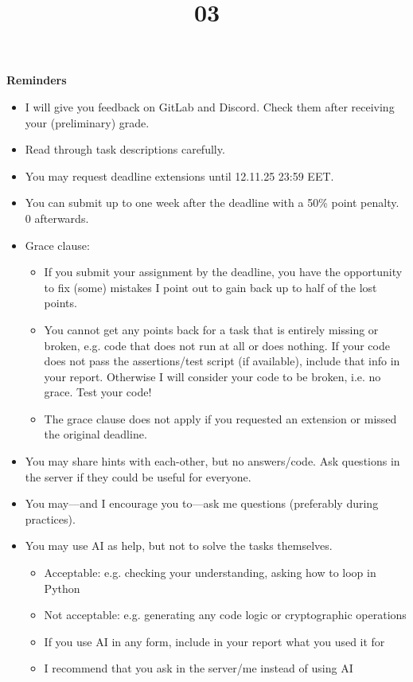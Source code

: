\documentclass{homework}
\title{03}
\date{\DTMdate{2025-11-15}}
\begin{document}
\maketitle

\textbf{Reminders}

\begin{itemize}
  \item I will give you feedback on GitLab and Discord.
  Check them after receiving your (preliminary) grade.
  \item Read through task descriptions carefully.
  \item You may request deadline extensions until 12.11.25 23:59 EET.
  \item You can submit up to one week after the deadline with a 50\% point penalty.
  0 afterwards.
  \item Grace clause:
  \begin{itemize}
    \item If you submit your assignment by the deadline, you have the opportunity to fix (some) mistakes I point out to gain back up to half of the lost points.
    \item You cannot get any points back for a task that is entirely missing or broken, e.g. code that does not run at all or does nothing.
    If your code does not pass the assertions/test script (if available), include that info in your report.
    Otherwise I will consider your code to be broken, i.e. no grace.
    Test your code!
    \item The grace clause does not apply if you requested an extension or missed the original deadline.
  \end{itemize}
  \item You may share hints with each-other, but no answers/code.
  Ask questions in the server if they could be useful for everyone.
  \item You may---and I encourage you to---ask me questions (preferably during practices).
  \item You may use AI as help, but not to solve the tasks themselves.
  \begin{itemize}
    \item Acceptable: e.g. checking your understanding, asking how to loop in Python
    \item Not acceptable: e.g. generating any code logic or cryptographic operations
    \item If you use AI in any form, include in your report what you used it for
    \item I recommend that you ask in the server/me instead of using AI

\end{itemize}
\end{itemize}
\end{document}
